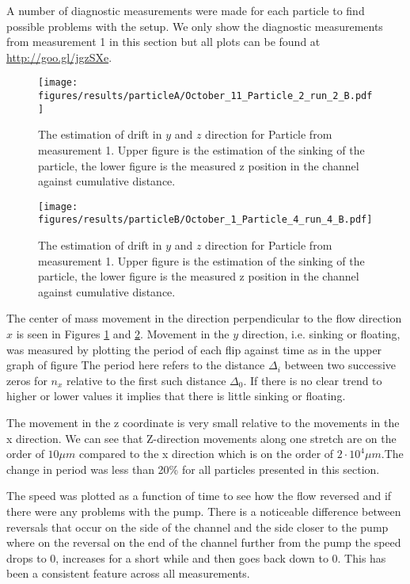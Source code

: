 
A number of diagnostic measurements were made for each particle to find possible problems with the setup. We only show the diagnostic measurements from measurement 1 in this section but all plots can be found at \url{http://goo.gl/jgzSXe}.


\begin{figure}[H]
\begin{center}
\texttt{[image: figures/results/particleA/October\_11\_Particle\_2\_run\_2\_B.pdf]}
\end{center}
\caption{The estimation of drift in $y$ and $z$ direction for Particle from measurement 1. Upper figure is the estimation of the sinking of the particle, the lower figure is the measured z position in the channel against cumulative distance. }
\label{fig:particleAsink}
\end{figure}

\begin{figure}[H]
\centering
\texttt{[image: figures/results/particleB/October\_1\_Particle\_4\_run\_4\_B.pdf]}	
\caption{The estimation of drift in $y$ and $z$ direction for Particle from measurement 1. Upper figure is the estimation of the sinking of the particle, the lower figure is the measured z position in the channel against cumulative distance.}
\label{fig:particleB2sinking}
\end{figure}



The center of mass movement in the direction perpendicular to the flow direction $x$ is seen in Figures \ref{fig:particleAsink} and \ref{fig:particleB2sinking}. Movement in the $y$ direction, i.e. sinking or floating, was measured by plotting the period of each flip against time as in the upper graph of figure  The period here refers to the distance $\Delta_i$ between two successive zeros for $n_x$ relative to the first such distance $\Delta_0$. If there is no clear trend to higher or lower values it implies that there is little sinking or floating. 

The movement in the z coordinate is very small relative to the movements in the x direction. We can see that Z-direction movements along one stretch are on the order of $10\mu m$ compared to the x direction which is on the order of $2\cdot 10^4 \mu m$.The change in period was less than 20\% for all particles presented in this section.

The speed was plotted as a function of time to see how the flow reversed and if there were any problems with the pump. There is a noticeable difference between reversals that occur on the side of the channel and the side closer to the pump where on the reversal on the end of the channel further from the pump the speed drops to 0, increases for a short while and then goes back down to 0. This has been a consistent feature across all measurements.


